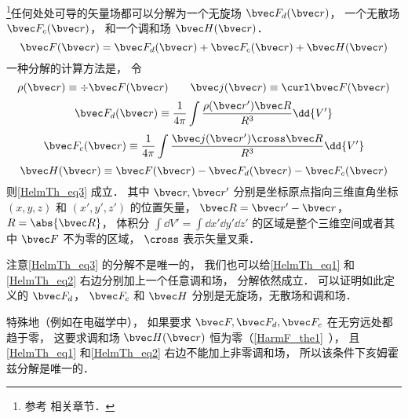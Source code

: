 
\begin{issues}
\issueTODO
\end{issues}


\footnote{参考 \cite{GriffE} 相关章节．}任何处处可导的矢量场都可以分解为一个无旋场 $\bvec F_{d}(\bvec r)$， 一个无散场 $\bvec F_{c}(\bvec r)$， 和一个调和场 $\bvec H(\bvec r)$．
\begin{equation}\label{HelmTh_eq3}
\bvec F(\bvec r) = \bvec F_{d}(\bvec r) + \bvec F_{c}(\bvec r) + \bvec H(\bvec r)
\end{equation}
一种分解的计算方法是， 令
\begin{equation}
\rho(\bvec r) \equiv \div \bvec F(\bvec r) \qquad
\bvec j(\bvec r) \equiv \curl \bvec F(\bvec r)
\end{equation}
\begin{equation}\label{HelmTh_eq1}
\bvec F_{d}(\bvec r) \equiv \frac{1}{4\pi}\int \frac{\rho(\bvec r') \bvec R}{R^3} \dd{V'}
\end{equation}
\begin{equation}\label{HelmTh_eq2}
\bvec F_{c}(\bvec r) \equiv \frac{1}{4\pi}\int \frac{\bvec j(\bvec r')\cross \bvec R}{R^3} \dd{V'}
\end{equation}
\begin{equation}\label{HelmTh_eq4}
\bvec H(\bvec r) \equiv \bvec F(\bvec r) - \bvec F_{d}(\bvec r) - \bvec F_{c}(\bvec r)
\end{equation}
则\autoref{HelmTh_eq3} 成立． 其中 $\bvec r, \bvec r'$ 分别是坐标原点指向三维直角坐标 $(x, y, z)$ 和 $(x', y', z')$ 的位置矢量， $\bvec R = \bvec r' - \bvec r$， $R = \abs{\bvec R}$， 体积分 $\int\dd{V'} = \int\dd{x'}\dd{y'}\dd{z'}$ 的区域是整个三维空间或者其中 $\bvec F$ 不为零的区域， $\cross$ 表示矢量叉乘．

注意\autoref{HelmTh_eq3} 的分解不是唯一的， 我们也可以给\autoref{HelmTh_eq1} 和\autoref{HelmTh_eq2} 右边分别加上一个任意调和场， 分解依然成立． 可以证明如此定义的 $\bvec F_{d}$， $\bvec F_{c}$ 和 $\bvec H$ 分别是无旋场，无散场和调和场．

特殊地（例如在电磁学中）， 如果要求 $\bvec F, \bvec F_d, \bvec F_c$ 在无穷远处都趋于零， 这要求调和场 $\bvec H(\bvec r)$ 恒为零（\autoref{HarmF_the1}~）， 且\autoref{HelmTh_eq1} 和\autoref{HelmTh_eq2} 右边不能加上非零调和场， 所以该条件下亥姆霍兹分解是唯一的．

